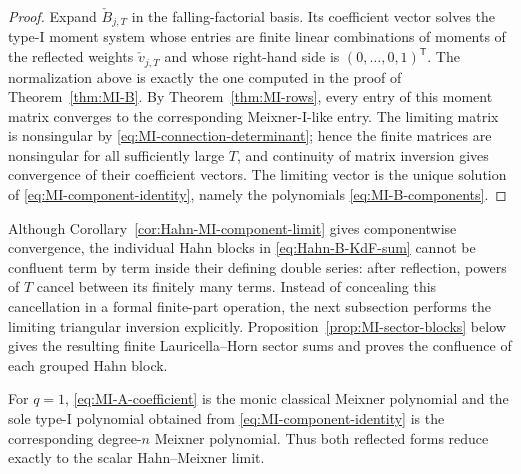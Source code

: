 \documentclass[10pt]{amsart}
\theoremstyle{plain}
\theoremstyle{definition}
\theoremstyle{remark}
\begin{document}
\begin{proof}
Expand
\(\check B_{j,T}\) in the falling-factorial basis.  Its coefficient
vector solves the type-I moment system whose entries are finite linear
combinations of moments of the reflected weights \(\check v_{j,T}\) and
whose right-hand side is \((0,\ldots,0,1)^{\mathsf T}\).  The
normalization above is exactly the one computed in the proof of
Theorem~\ref{thm:MI-B}.  By Theorem~\ref{thm:MI-rows}, every entry of
this moment matrix converges to the corresponding Meixner-I-like entry.
The limiting matrix is nonsingular by
\eqref{eq:MI-connection-determinant}; hence the finite matrices are
nonsingular for all sufficiently large \(T\), and continuity of matrix
inversion gives convergence of their coefficient vectors.  The limiting
vector is the unique solution of
\eqref{eq:MI-component-identity}, namely the polynomials
\eqref{eq:MI-B-components}.
\end{proof}

Although Corollary~\ref{cor:Hahn-MI-component-limit} gives componentwise
convergence, the individual Hahn blocks in \eqref{eq:Hahn-B-KdF-sum} cannot be
confluent term by term inside their defining double series: after
reflection, powers of \(T\) cancel between its finitely many terms.
Instead of concealing this cancellation in a formal finite-part
operation, the next subsection performs the limiting triangular inversion
explicitly.  Proposition~\ref{prop:MI-sector-blocks} below gives the
resulting finite Lauricella--Horn sector sums and proves the confluence of each
grouped Hahn block.

For \(q=1\), \eqref{eq:MI-A-coefficient} is the monic classical Meixner
polynomial and the sole type-I polynomial obtained from
\eqref{eq:MI-component-identity} is the corresponding degree-\(n\)
Meixner polynomial. Thus both reflected forms reduce exactly to the scalar
Hahn--Meixner limit.
\end{document}
